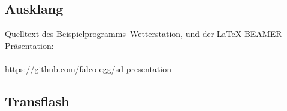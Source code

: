 \documentclass[ngerman]{schoolPres}
\begin{document}
  \subsection{Ausklang}
  \begin{frame}
    \vfill
      {
        \Large
        Quelltext des \textcolor{cyan}{\hyperlink{sec:project}{Beispielprogramms~Wetterstation}},
        und der \href{https://www.latex-project.org/}{\LaTeX} \href{https://ctan.org/pkg/beamer}{BEAMER} Präsentation:\\~\\
        \hspace{1em} \url{https://github.com/falco-egg/sd-presentation}
      }

    \vfill
    {\doclicenseText \hfill \doclicenseIcon}
  \end{frame}

  \subsection*{Transflash}%
  \begin{frame}
  \end{frame}
\end{document}
